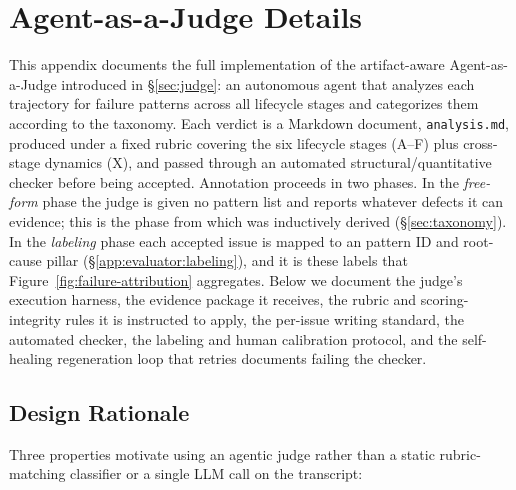 %

\section{Agent-as-a-Judge Details}
\label{app:agent-as-a-judge}

This appendix documents the full implementation of the artifact-aware
Agent-as-a-Judge introduced in \S\ref{sec:judge}: an autonomous agent that
analyzes each trajectory for failure patterns across all \taxonomy lifecycle
stages and categorizes them according to the taxonomy. Each verdict is a
Markdown document, \texttt{analysis.md}, produced under a fixed rubric
covering the six lifecycle stages (A--F) plus cross-stage dynamics (X), and
passed through an automated structural/quantitative checker before being
accepted. Annotation proceeds in two phases. In the \emph{free-form} phase
the judge is given no pattern list and reports whatever defects it can
evidence; this is the phase from which \taxonomy was inductively derived
(\S\ref{sec:taxonomy}). In the \emph{labeling} phase each accepted issue
is mapped to an \taxonomy pattern ID and root-cause pillar
(\S\ref{app:evaluator:labeling}), and it is these labels that
Figure~\ref{fig:failure-attribution} aggregates. Below we document the
judge's execution harness, the evidence package it receives, the rubric
and scoring-integrity rules it is instructed to apply, the per-issue
writing standard, the automated checker, the labeling and human
calibration protocol, and the self-healing regeneration loop that retries
documents failing the checker.

\subsection{Design Rationale}
\label{app:evaluator:rationale}

Three properties motivate using an agentic judge rather than a static
rubric-matching classifier or a single LLM call on the transcript:

